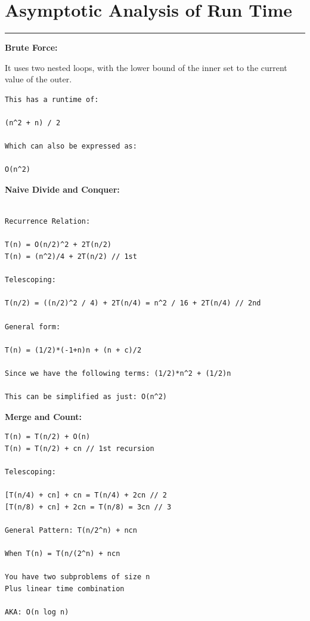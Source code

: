 \documentclass[letterpaper,10pt,titlepage,fleqn]{article}
\begin{document}
\section*{Asymptotic Analysis of Run Time}
\hrule
\begin{centering}
\textbf{Brute Force:}
\end{centering}
It uses two nested loops, with the lower bound of the inner set to the current value of the outer. 

\begin{lstlisting}
This has a runtime of: 

(n^2 + n) / 2 

Which can also be expressed as:

O(n^2)
\end{lstlisting}

\begin{centering}
\textbf{Naive Divide and Conquer:}
\end{centering}

\begin{lstlisting}

Recurrence Relation:

T(n) = O(n/2)^2 + 2T(n/2)
T(n) = (n^2)/4 + 2T(n/2) // 1st

Telescoping: 

T(n/2) = ((n/2)^2 / 4) + 2T(n/4) = n^2 / 16 + 2T(n/4) // 2nd

General form:

T(n) = (1/2)*(-1+n)n + (n + c)/2

Since we have the following terms: (1/2)*n^2 + (1/2)n

This can be simplified as just: O(n^2)

\end{lstlisting}

\begin{centering}
\textbf{Merge and Count:}
\end{centering}

\begin{lstlisting}
T(n) = T(n/2) + O(n) 
T(n) = T(n/2) + cn // 1st recursion 

Telescoping:

[T(n/4) + cn] + cn = T(n/4) + 2cn // 2 
[T(n/8) + cn] + 2cn = T(n/8) = 3cn // 3 

General Pattern: T(n/2^n) + ncn

When T(n) = T(n/(2^n) + ncn

You have two subproblems of size n
Plus linear time combination

AKA: O(n log n)
\end{lstlisting}
\end{document}

